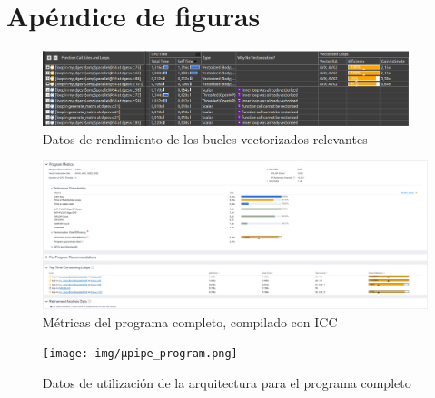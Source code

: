 \documentclass[12pt]{article}
\begin{document}
\section*{Apéndice de figuras}
\begin{figure}[h]
	\centering
	\includegraphics[width=0.95\textwidth]{img/gains_advisor.png}
	\caption{Datos de rendimiento de los bucles vectorizados relevantes}
	\label{fig:advisor_bucles}
\end{figure}
\begin{figure}[h]
	\centering
	\includegraphics[width=\textwidth]{img/program_metrics.png}
	\caption{Métricas del programa completo, compilado con ICC}
	\label{fig:metricas}
\end{figure}
\begin{figure}[h]
	\centering
	\texttt{[image: img/µpipe\_program.png]}
	\caption{Datos de utilización de la arquitectura para el programa completo}
	\label{fig:micropipe}
\end{figure}
\end{document}

